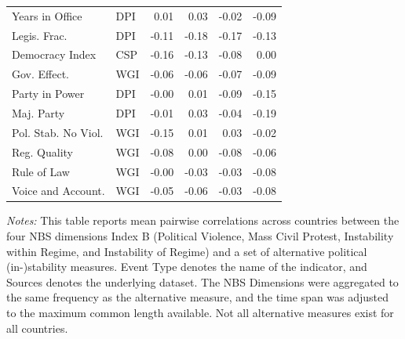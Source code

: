 \begin{table}[htbp]
\begin{minipage}{0.7\linewidth}
\begin{tabular}{llrrrr}
  Years in Office & DPI & 0.01 & 0.03 & -0.02 & -0.09 \\ 
  Legis. Frac. & DPI & -0.11 & -0.18 & -0.17 & -0.13 \\ 
  Democracy Index & CSP & -0.16 & -0.13 & -0.08 & 0.00 \\ 
  Gov. Effect. & WGI & -0.06 & -0.06 & -0.07 & -0.09 \\ 
  Party in Power & DPI & -0.00 & 0.01 & -0.09 & -0.15 \\ 
  Maj. Party & DPI & -0.01 & 0.03 & -0.04 & -0.19 \\ 
  Pol. Stab. No Viol. & WGI & -0.15 & 0.01 & 0.03 & -0.02 \\ 
  Reg. Quality & WGI & -0.08 & 0.00 & -0.08 & -0.06 \\ 
  Rule of Law & WGI & -0.00 & -0.03 & -0.03 & -0.08 \\ 
  Voice and Account. & WGI & -0.05 & -0.06 & -0.03 & -0.08 \\ 
\bottomrule
\end{tabular}
\vspace{0.5em}
{\footnotesize \flushleft \textit{Notes:} This table reports mean pairwise correlations across countries between the four NBS dimensions Index B (Political Violence, Mass Civil Protest, Instability within Regime, and Instability of Regime) and a set of alternative political (in-)stability measures. Event Type denotes the name of the indicator, and Sources denotes the underlying dataset. The NBS Dimensions were aggregated to the same frequency as the alternative measure, and the time span was adjusted to the maximum common length available. Not all alternative measures exist for all countries.}
\end{minipage}
\end{table}
